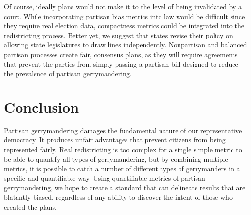 \documentclass[12pt]{article}
\begin{document}
  Of course, ideally plans would not make it to the level of being invalidated by a court.  While incorporating partisan bias metrics into law would be difficult since they require real election data, compactness metrics could be integrated into the redistricting process.  Better yet, we suggest that states revise their policy on allowing state legislatures to draw lines independently.  Nonpartisan and balanced partisan processes create fair, consensus plans, as they will require agreements that prevent the parties from simply passing a partisan bill designed to reduce the prevalence of partisan gerrymandering.

  \section{Conclusion}\label{s:conclusion}
  Partisan gerrymandering damages the fundamental nature of our representative democracy.  It produces unfair advantages that prevent citizens from being represented fairly.  Real redistricting is too complex for a single simple metric to be able to quantify all types of gerrymandering, but by combining multiple metrics, it is possible to catch a number of different types of gerrymanders in a specific and quantifiable way.  Using quantifiable metrics of partisan gerrymandering, we hope to create a standard that can delineate results that are blatantly biased, regardless of any ability to discover the intent of those who created the plans.


  \singlespacing{}

  \printbibliography{}
\end{document}

